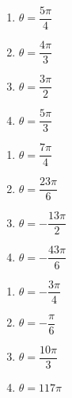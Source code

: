 \begin{multicols}{4}

\begin{enumerate}

\setcounter{enumi}{\value{HW}}

\item $\theta = \dfrac{5\pi}{4}$
\item $\theta = \dfrac{4\pi}{3}$
\item $\theta = \dfrac{3\pi}{2}$
\item $\theta = \dfrac{5\pi}{3}$

\setcounter{HW}{\value{enumi}}

\end{enumerate}

\end{multicols}

\begin{multicols}{4}

\begin{enumerate}

\setcounter{enumi}{\value{HW}}

\item $\theta = \dfrac{7\pi}{4}$
\item $\theta = \dfrac{23\pi}{6}$
\item $\theta = -\dfrac{13\pi}{2}$
\item $\theta = -\dfrac{43\pi}{6}$

\setcounter{HW}{\value{enumi}}

\end{enumerate}

\end{multicols}

\begin{multicols}{4}

\begin{enumerate}

\setcounter{enumi}{\value{HW}}

\item $\theta = -\dfrac{3\pi}{4}$
\item $\theta = -\dfrac{\pi}{6}$ 
\item $\theta = \dfrac{10\pi}{3}$
\item $\theta = 117\pi$  \label{valuelast}

\setcounter{HW}{\value{enumi}}

\end{enumerate}

\end{multicols}

